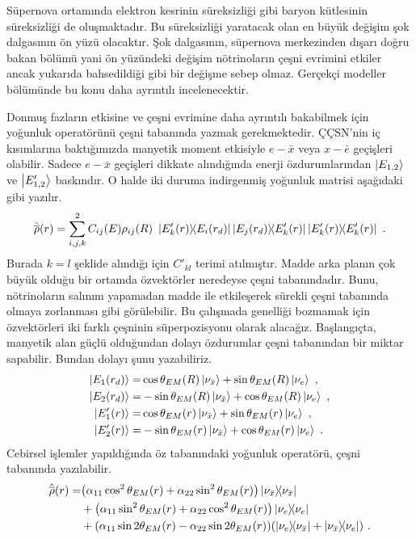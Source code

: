 Süpernova ortamında elektron kesrinin süreksizliği gibi baryon kütlesinin süreksizliği de oluşmaktadır. Bu süreksizliği yaratacak olan en büyük değişim şok dalgasının ön yüzü olacaktır. Şok dalgasının, süpernova merkezinden dışarı doğru bakan bölümü yani ön yüzündeki değişim nötrinoların çeşni evrimini etkiler ancak yukarıda bahsedildiği gibi bir değişme sebep olmaz. Gerçekçi modeller bölümünde bu konu daha ayrıntılı incelenecektir.

Donmuş fazların etkisine ve çeşni evrimine daha ayrıntılı bakabilmek için yoğunluk operatörünü çeşni tabanında yazmak gerekmektedir. ÇÇSN'nin iç kısımlarına baktığımızda manyetik moment etkisiyle $ e-\bar{x} $ veya $ x-\bar{e} $ geçişleri olabilir. Sadece $ e-\bar{x} $ geçişleri dikkate alındığında enerji özdurumlarından $ \ket{E_{1,2}} $ ve $ \ket{E'_{1,2}} $ baskındır. O halde iki duruma indirgenmiş yoğunluk matrisi aşağıdaki gibi yazılır.
\begin{equation}
    \hat{\overline{\rho}}(r) = \sum^{2}_{i,j,k} C_{ij}(E) \rho_{ij}(R) ~\dyad{E'_{k}(r)}{E_{i}(r_{d})} \dyad{E_{j}(r_{d})}{E'_{k}(r)} \dyad{E'_{k}(r)}{E'_{k}(r)} \text{ .}
\end{equation}
Burada $ k=l $ şeklide alındığı için $C'_{kl} $ terimi atılmıştır. Madde arka planın çok büyük olduğu bir ortamda özvektörler neredeyse çeşni tabanındadır. Bunu, nötrinoların salınım yapamadan madde ile etkileşerek sürekli çeşni tabanında olmaya zorlanması gibi görülebilir. Bu çalışmada genelliği bozmamak için özvektörleri iki farklı çeşninin süperpozisyonu olarak alacağız. Başlangıçta, manyetik alan güçlü olduğundan dolayı özdurumlar çeşni tabanından bir miktar sapabilir. Bundan dolayı şunu yazabiliriz.
\begin{align}
    \ket{E_{1}(r_{d})} =& \cos{\theta_{EM}(R)} \ket{\nu_{\bar{x}}} + \sin{\theta_{EM}(R)} \ket{\nu_{e}} \text{ ,} \\
    \ket{E_{2}(r_{d})} =&-\sin{\theta_{EM}(R)} \ket{\nu_{\bar{x}}} + \cos{\theta_{EM}(R)} \ket{\nu_{e}} \text{ ,} \\
    \ket{E'_{1}(r)} =& \cos{\theta_{EM}(r)} \ket{\nu_{\bar{x}}} + \sin{\theta_{EM}(r)} \ket{\nu_{e}}    \text{ ,} \\
    \ket{E'_{2}(r)} =&-\sin{\theta_{EM}(r)} \ket{\nu_{\bar{x}}} + \cos{\theta_{EM}(r)} \ket{\nu_{e}} \text{ .}
\end{align}
Cebirsel işlemler yapıldığında öz tabanındaki yoğunluk operatörü, çeşni tabanında yazılabilir.
\begin{align}
    \nonumber \hat{\overline{\rho}}(r) = &\qty(\alpha_{11}\cos^{2}\theta_{EM}(r) + \alpha_{22}\sin^{2}\theta_{EM}(r) ) \dyad{\nu_{\bar{x}}}{\nu_{\bar{x}}} \\
    \nonumber &+ \qty(\alpha_{11}\sin^{2}\theta_{EM}(r) + \alpha_{22}\cos^{2}\theta_{EM}(r) ) \dyad{\nu_{e}}{\nu_{e}} \\
    &+ \qty(\alpha_{11}\sin{2\theta_{EM}(r)} - \alpha_{22}\sin{2\theta_{EM}(r)} ) \qty(\dyad{\nu_{e}}{\nu_{\bar{x}}} + \dyad{\nu_{\bar{x}}}{\nu_{e}})  \text{ .}
\end{align}
